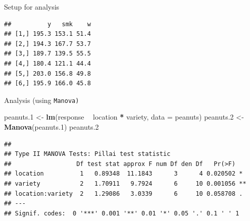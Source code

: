 \documentclass[
  ignorenonframetext,
]{beamer}
\newenvironment{Shaded}{\begin{snugshade}}{\end{snugshade}}
\newcommand{\DataTypeTok}[1]{\textcolor[rgb]{0.13,0.29,0.53}{#1}}
\newcommand{\FloatTok}[1]{\textcolor[rgb]{0.00,0.00,0.81}{#1}}
\newcommand{\KeywordTok}[1]{\textcolor[rgb]{0.13,0.29,0.53}{\textbf{#1}}}
\newcommand{\NormalTok}[1]{#1}
\newcommand{\OperatorTok}[1]{\textcolor[rgb]{0.81,0.36,0.00}{\textbf{#1}}}
\newcommand{\StringTok}[1]{\textcolor[rgb]{0.31,0.60,0.02}{#1}}
\begin{document}
\begin{frame}[fragile]{Setup for analysis}
\protect\hypertarget{setup-for-analysis}{}

\begin{Shaded}
\end{Shaded}

\begin{verbatim}
##          y   smk    w
## [1,] 195.3 153.1 51.4
## [2,] 194.3 167.7 53.7
## [3,] 189.7 139.5 55.5
## [4,] 180.4 121.1 44.4
## [5,] 203.0 156.8 49.8
## [6,] 195.9 166.0 45.8
\end{verbatim}

\end{frame}

\begin{frame}[fragile]{Analysis (using \texttt{Manova)}}
\protect\hypertarget{analysis-using-manova}{}

\small

\begin{Shaded}
\begin{Highlighting}[]
\NormalTok{peanuts}\FloatTok{.1}\NormalTok{ <-}\StringTok{ }\KeywordTok{lm}\NormalTok{(response }\OperatorTok{~}\StringTok{ }\NormalTok{location }\OperatorTok{*}\StringTok{ }\NormalTok{variety, }\DataTypeTok{data =}\NormalTok{ peanuts)}
\NormalTok{peanuts}\FloatTok{.2}\NormalTok{ <-}\StringTok{ }\KeywordTok{Manova}\NormalTok{(peanuts}\FloatTok{.1}\NormalTok{)}
\NormalTok{peanuts}\FloatTok{.2}
\end{Highlighting}
\end{Shaded}

\begin{verbatim}
## 
## Type II MANOVA Tests: Pillai test statistic
##                  Df test stat approx F num Df den Df   Pr(>F)   
## location          1   0.89348  11.1843      3      4 0.020502 * 
## variety           2   1.70911   9.7924      6     10 0.001056 **
## location:variety  2   1.29086   3.0339      6     10 0.058708 . 
## ---
## Signif. codes:  0 '***' 0.001 '**' 0.01 '*' 0.05 '.' 0.1 ' ' 1
\end{verbatim}

\normalsize

\end{frame}
\end{document}
